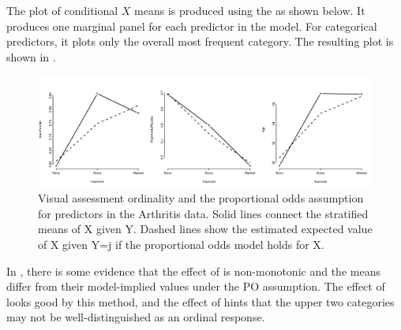 \documentclass[11pt]{book}
\renewenvironment{knitrout}{\small\renewcommand{\baselinestretch}{.85}}{} %
\begin{document}
The plot of conditional $X$ means is produced using the  as shown
below.  It produces one marginal panel for each predictor in the model.  
For categorical predictors, it plots only the overall most frequent category.
The resulting plot is shown in .
\begin{knitrout}
\color{fgcolor}\begin{kframe}
\begin{alltt}
 \hlkwb{<-} \hlstd{(}\hlstd{=}\hlstd{(}\hlstd{,}\hlstd{))}
 \hlopt{~}  \hlopt{+}  \hlopt{+}  
                    \hlstd{=}\hlstd{,} \hlstd{=}\hlstd{,} \hlstd{=}\hlstd{)}
\end{alltt}
\end{kframe}\begin{figure}[!htbp]


\centerline{\includegraphics[width=\textwidth]{ch07/fig/arth-rmsplot} }

\caption[Visual assessment ordinality and the proportional odds assumption for predictors in the Arthritis data]{Visual assessment ordinality and the proportional odds assumption for predictors in the Arthritis data. Solid lines connect the stratified means of X given Y. Dashed lines show the estimated expected value of X given Y=j if the proportional odds model holds for X.\label{fig:arth-rmsplot}}
\end{figure}


\end{knitrout}
In , there is some evidence that the effect of  is
non-monotonic and the means differ from their model-implied values under the 
PO assumption.  The effect of  looks good by this method, and
the effect of  hints that the upper two categories may not be 
well-distinguished as an ordinal response.
\end{document}

